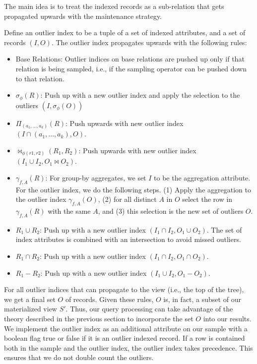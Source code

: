 The main idea is to treat the indexed records as a sub-relation that gets propagated upwards with the maintenance strategy.
\begin{definition}
Define an outlier index to be a tuple of a set of indexed attributes, and a set of records $(I,O)$. The outlier index propagates upwards with the following rules: 
\begin{itemize}[noitemsep]
\item Base Relations: Outlier indices on base relations are pushed up only if that relation is being sampled, i.e., if the sampling operator can be pushed down to that relation.
\item $\sigma_{\phi}(R)$: Push up with a new outlier index and apply the selection to the outliers $(I,\sigma_{\phi}(O))$ 
\item $\Pi_{(a_1,...,a_k)}(R)$: Push upwards with new outlier index $(I \cap (a_1,...,a_k), O)$.
\item $\bowtie_{\phi (r1,r2)}(R_1,R_2)$: Push upwards with new outlier index $(I_{1} \cup I_{2}, O_1 \bowtie O_2)$. 
\item $\gamma_{f,A}(R)$: For group-by aggregates, we set $I$ to be the aggregation attribute. For the outlier index, we do the following steps. (1) Apply the aggregation to the outlier index $\gamma_{f,A}(O)$, (2) for all distinct $A$ in $O$ select the row in $\gamma_{f,A}(R)$ with the same $A$, and (3) this selection is the new set of outliers $O$. 
\item $R_1 \cup R_2$: Push up with a new outlier index $(I_1 \cap I_2, O_1 \cup O_2)$. The set of index attributes is combined with an intersection to avoid missed outliers.
\item $R_1 \cap R_2$: Push up with a new outlier index $(I_1 \cap I_2, O_1 \cap O_2)$.
\item $R_1 - R_2$: Push up with a new outlier index $(I_1 \cup I_2, O_1 - O_2)$.
\end{itemize}
\end{definition}

For all outlier indices that can propagate to the view (i.e., the top of the tree), we get a final set $O$ of records. 
Given these rules, $O$ is, in fact, a subset of our materialized view $S'$.
Thus, our query processing can take advantage of the theory described in the previous section to incorporate the set $O$ into our results.
We implement the outlier index as an additional attribute on our sample with a boolean flag true or false if it is an outlier indexed record.
If a row is contained both in the sample and the outlier index, the outlier index takes precedence.
This ensures that we do not double count the outliers.

